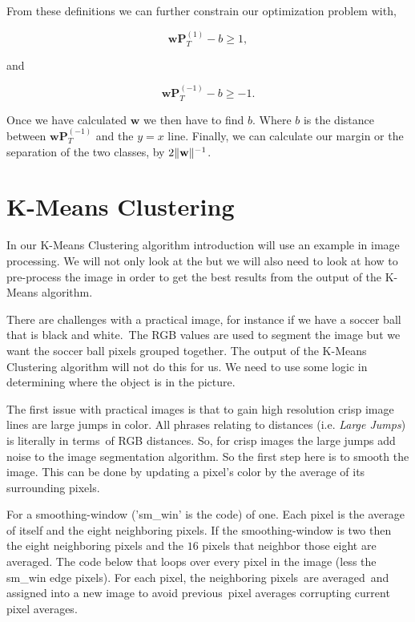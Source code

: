 From these definitions we can further constrain our optimization problem with,

\begin{equation}
\mathbf{w}\mathbf{P}^{(1)}_T - b \geq 1,
\end{equation}

and

\begin{equation}
\mathbf{w}\mathbf{P}^{(-1)}_T - b \geq -1.
\end{equation}

Once we have calculated $\mathbf{w}$ we then have to find $b$. Where $b$ is the distance between $\mathbf{w}\mathbf{P}^{(-1)}_T$ and the $y=x$ line. Finally, we can calculate our margin or the separation of the two classes, by $2\| \mathbf{w} \|^{-1}$.

\section{K-Means Clustering}

In our K-Means Clustering algorithm introduction will use an example in image processing. We will not only look at the  but we will also need to look at how to pre-process the image in order to get the best results from the output of the K-Means algorithm. 

There are challenges with a practical image, for instance if we have a soccer ball that is black and white. The \ac{RGB} values are used to segment the image but we want the soccer ball pixels grouped together. The output of the K-Means Clustering algorithm will not do this for us. We need to use some logic in determining where the object is in the picture.

The first issue with practical images is that to gain high resolution crisp image lines are large jumps in color. All phrases relating to distances (i.e. \emph{Large Jumps}) is literally in terms of \ac{RGB} distances. So, for crisp images the large jumps add noise to the image segmentation algorithm. So the first step here is to smooth the image. This can be done by updating a pixel's color by the average of its surrounding pixels.

For a smoothing-window ('sm\_win' is the code) of one. Each pixel is the average of itself and the eight neighboring pixels. If the smoothing-window is two then the eight neighboring pixels and the $16$ pixels that neighbor those eight are averaged. The code below that loops over every pixel in the image (less the sm\_win edge pixels). For each pixel, the neighboring pixels are averaged and assigned into a new image to avoid previous pixel averages corrupting current pixel averages.

